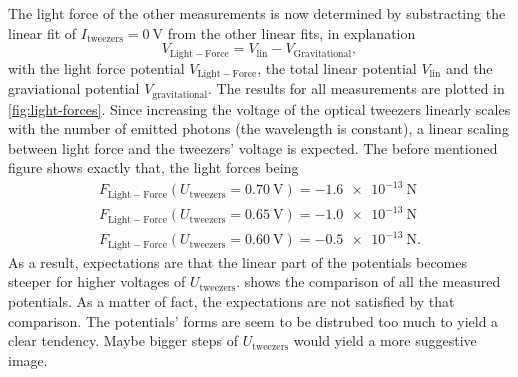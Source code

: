 \documentclass[../bericht.tex]{subfiles}
\begin{document}
      The light force of the other measurements is now determined by substracting the linear fit of $I_\mathrm{tweezers}=\SI{0}{\volt}$ from the other linear fits, in explanation
      \begin{equation}
          V_\mathrm{Light-Force} = V_\mathrm{lin} - V_\mathrm{Gravitational},
          \label{eq:light-forces}
      \end{equation}
      with the light force potential $V_\mathrm{Light-Force}$, the total linear potential $V_\mathrm{lin}$ and the graviational potential $V_\mathrm{gravitational}$. The results for all measurements are plotted in \cref{fig:light-forces}. Since increasing the voltage of the optical tweezers linearly scales with the number of emitted photons (the wavelength is constant), a linear scaling between light force and the tweezers' voltage is expected. The before mentioned figure shows exactly that, the light forces being
      \begin{align*}
        F_\mathrm{Light-Force}(U_\mathrm{tweezers}=\SI{0,70}{\volt})=\SI{-1,6e-13}{\newton} \\
        F_\mathrm{Light-Force}(U_\mathrm{tweezers}=\SI{0,65}{\volt})=\SI{-1,0e-13}{\newton} \\
        F_\mathrm{Light-Force}(U_\mathrm{tweezers}=\SI{0,60}{\volt})=\SI{-0,5e-13}{\newton} .
      \end{align*}
      As a result, expectations are that the linear part of the potentials becomes steeper for higher voltages of $U_\mathrm{tweezers}$.  shows the comparison of all the measured potentials. As a matter of fact, the expectations are not satisfied by that comparison. The potentials' forms are seem to be distrubed too much to yield a clear tendency. Maybe bigger steps of $U_\mathrm{tweezers}$ would yield a more suggestive image.
\end{document}
